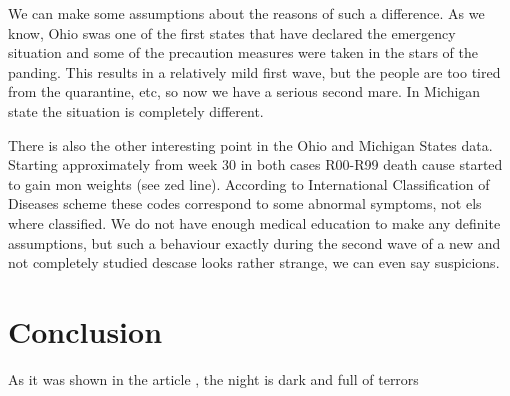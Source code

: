 \documentclass[conference]{IEEEtran}
\begin{document}
We  can make some assumptions about the reasons of such a difference. As we know, Ohio swas one of the first states that have declared the emergency situation and some of the precaution measures were taken in the stars of the panding. This results in a relatively mild first wave, but the people are too tired from the quarantine, etc, so now we have a serious second mare. In Michigan state the situation is completely different.

There is also the other interesting point in the Ohio and Michigan States data. Starting approximately from week 30 in both cases R00-R99 death cause started to gain mon weights (see zed line). According to  International Classification of Diseases scheme  \cite{ICD-10} these codes correspond to some abnormal symptoms, not els where classified. We do not have enough medical education to make any definite assumptions, but such a behaviour exactly during the second wave of a new and not completely studied descase looks rather strange, we can even say suspicions.




\section{Conclusion}

As it was shown in the article \cite{IEEEexample:article_typical}, the night is dark and full of terrors




\end{document}

